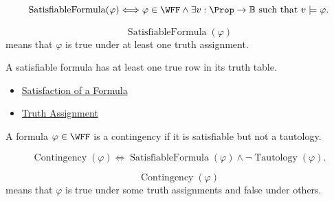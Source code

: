 \begin{remark*}
\[
\operatorname{SatisfiableFormula}(\varphi)
\Longleftrightarrow
\varphi\in\WFF
\land
\exists v:\Prop\to\mathbb{B}\text{ such that }v\models\varphi.
\]
\end{remark*}

\begin{remark*}
\[
\operatorname{SatisfiableFormula}(\varphi)
\]
means that \(\varphi\) is true under at least one truth assignment.
\end{remark*}

\begin{remark*}[Interpretation]
A satisfiable formula has at least one true row in its truth table.
\end{remark*}

\begin{dependencies}
\begin{itemize}
  \item \hyperref[def:satisfaction-propositional-formula]{Satisfaction of a Formula}
  \item \hyperref[def:truth-assignment-propositional-logic]{Truth Assignment}
\end{itemize}
\end{dependencies}
\begin{tcolorbox}[colback=propbox, colframe=propborder, arc=2pt,
  left=6pt, right=6pt, top=4pt, bottom=4pt,
  title={\small\textbf{Definition (Contingency)}},
  fonttitle=\small\bfseries]
\begin{definition}[Contingency]
\label{def:contingency-propositional-logic}
A formula \(\varphi\in\WFF\) is a contingency if it is satisfiable but not a tautology.
\end{definition}
\end{tcolorbox}

\begin{remark*}
\[
\operatorname{Contingency}(\varphi)
\Longleftrightarrow
\operatorname{SatisfiableFormula}(\varphi)
\land
\neg \operatorname{Tautology}(\varphi).
\]
\end{remark*}

\begin{remark*}
\[
\operatorname{Contingency}(\varphi)
\]
means that \(\varphi\) is true under some truth assignments and false under others.
\end{remark*}

